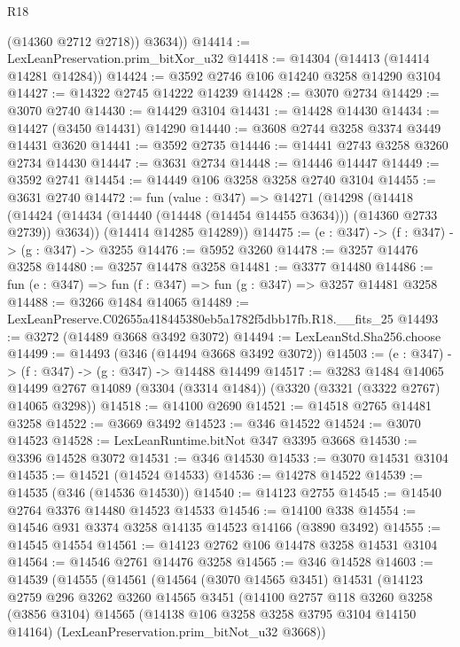 \begin{lexlean}{R18}
\begin{coremodule}
          (@14360 @2712 @2718))
        @3634))
@14414 := LexLeanPreservation.prim_bitXor_u32
@14418 := @14304 (@14413 (@14414 @14281 @14284))
@14424 := @3592 @2746 @106 @14240 @3258 @14290 @3104
@14427 := @14322 @2745 @14222 @14239
@14428 := @3070 @2734
@14429 := @3070 @2740
@14430 := @14429 @3104
@14431 := @14428 @14430
@14434 := @14427 (@3450 @14431) @14290
@14440 := @3608 @2744 @3258 @3374 @3449 @14431 @3620
@14441 := @3592 @2735
@14446 := @14441 @2743 @3258 @3260 @2734 @14430
@14447 := @3631 @2734
@14448 := @14446 @14447
@14449 := @3592 @2741
@14454 := @14449 @106 @3258 @3258 @2740 @3104
@14455 := @3631 @2740
@14472 := fun (value : @347) =>
  @14271
    (@14298
      (@14418 (@14424 (@14434 (@14440 (@14448 (@14454 @14455 @3634))) (@14360 @2733 @2739)) @3634))
      (@14414 @14285 @14289))
@14475 := (e : @347) -> (f : @347) -> (g : @347) -> @3255
@14476 := @5952 @3260
@14478 := @3257 @14476 @3258
@14480 := @3257 @14478 @3258
@14481 := @3377 @14480
@14486 := fun (e : @347) => fun (f : @347) => fun (g : @347) => @3257 @14481 @3258
@14488 := @3266 @1484 @14065
@14489 := LexLeanPreserve.C02655a418445380eb5a1782f5dbb17fb.R18.__fits_25
@14493 := @3272 (@14489 @3668 @3492 @3072)
@14494 := LexLeanStd.Sha256.choose
@14499 := @14493 (@346 (@14494 @3668 @3492 @3072))
@14503 := (e : @347) -> (f : @347) -> (g : @347) -> @14488 @14499
@14517 := @3283
    @1484
    @14065
    @14499
    @2767
    @14089
    (@3304 (@3314 @1484))
    (@3320 (@3321 (@3322 @2767) @14065 @3298))
@14518 := @14100 @2690
@14521 := @14518 @2765 @14481 @3258
@14522 := @3669 @3492
@14523 := @346 @14522
@14524 := @3070 @14523
@14528 := LexLeanRuntime.bitNot @347 @3395 @3668
@14530 := @3396 @14528 @3072
@14531 := @346 @14530
@14533 := @3070 @14531 @3104
@14535 := @14521 (@14524 @14533)
@14536 := @14278 @14522
@14539 := @14535 (@346 (@14536 @14530))
@14540 := @14123 @2755
@14545 := @14540 @2764 @3376 @14480 @14523 @14533
@14546 := @14100 @338
@14554 := @14546 @931 @3374 @3258 @14135 @14523 @14166 (@3890 @3492)
@14555 := @14545 @14554
@14561 := @14123 @2762 @106 @14478 @3258 @14531 @3104
@14564 := @14546 @2761 @14476 @3258
@14565 := @346 @14528
@14603 := @14539
    (@14555
      (@14561
        (@14564
          (@3070 @14565 @3451)
          @14531
          (@14123
            @2759
            @296
            @3262
            @3260
            @14565
            @3451
            (@14100
              @2757
              @118
              @3260
              @3258
              (@3856 @3104)
              @14565
              (@14138 @106 @3258 @3258 @3795 @3104 @14150 @14164)
              (LexLeanPreservation.prim_bitNot_u32 @3668))

\end{coremodule}
\end{lexlean}
